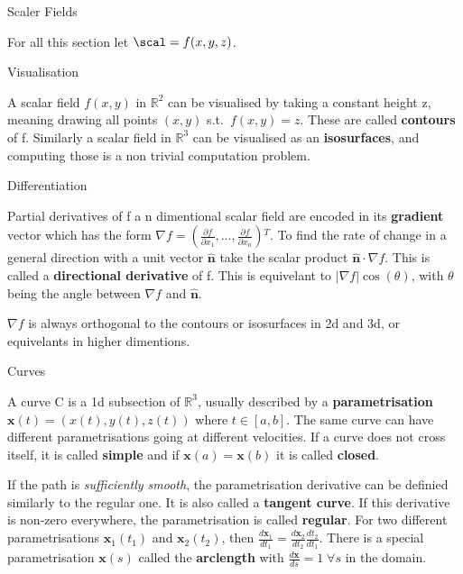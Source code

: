 \documentclass[12pt, letterpaper]{article}
\newcommand{\x}{\textbf{x}}
\newcommand{\norm}{\hat{\textbf{n}}}
\newcommand{\R}{\mathbb{R}}
\newcommand{\pder}[2]{\frac{\partial{} #1}{\partial{} #2}}
\newcommand{\der}[2]{\frac{d #1}{d #2}}
\begin{document}
\begin{section}{Scaler Fields}

  For all this section let \(\scal = f(x, y, z)\).

  \begin{subsection}{Visualisation}

    A scalar field \(f(x, y)\)  in \(\R^{2}\) can be visualised by taking a
    constant height z, meaning drawing all points \((x, y)\) s.t.\ \(f(x, y)
    = z\). These are called \textbf{contours} of f. Similarly a scalar field in
    \(\R^{3}\) can be visualised as an \textbf{isosurfaces}, and
    computing those is a non trivial computation problem.

  \end{subsection}

  \begin{subsection}{Differentiation}

    Partial derivatives of f a n dimentional scalar field are encoded in its
    \textbf{gradient} vector which has the form \(\nabla f =
    (\pder{f}{x_{1}}, \dots , \pder{f}{x_{n}}){}^{T}\). To find the rate of
    change in a general direction with a unit vector \(\norm\) take the scalar
    product \(\norm \cdot \nabla f\). This is called a
    \textbf{directional derivative} of f. This is equivelant to \(| \nabla f |
    \cos(\theta)\), with \(\theta\) being the angle between \(\nabla f\) and
    \(\norm\).

    \(\nabla f\) is always orthogonal to the contours or isosurfaces in 2d and
    3d, or equivelants in higher dimentions.

  \end{subsection}

  \begin{subsection}{Curves}

    A curve C is a 1d subsection of \(\R^{3}\), usually described by a
    \textbf{parametrisation} \(\x(t) = (x(t), y(t), z(t))\) where \(t \in
    [a, b]\). The same curve can have different parametrisations going at
    different velocities. If a curve does not cross itself, it is called
    \textbf{simple} and if \(\x(a) = \textbf{x}(b)\) it is called
    \textbf{closed}.

    If the path is \textit{sufficiently smooth}, the parametrisation derivative
    can be definied similarly to the regular one. It is also called a
    \textbf{tangent curve}. If this derivative is non-zero everywhere, the
    parametrisation is called \textbf{regular}. For two different
    parametrisations \(\x_{1}(t_{1})\) and \(\textbf{x}_{2}(t_{2})\),
    then \(\der{\x_{1}}{t_{1}} = \der{\x_{2}}{t_{2}} \der{t_{2}}{t_{1}}\).
    There is a special parametrisation \(\x(s)\) called the \textbf{arclength}
    with \(\der{\x}{s} = 1 \; \forall s\) in the domain.


\end{subsection}
\end{section}
\end{document}
